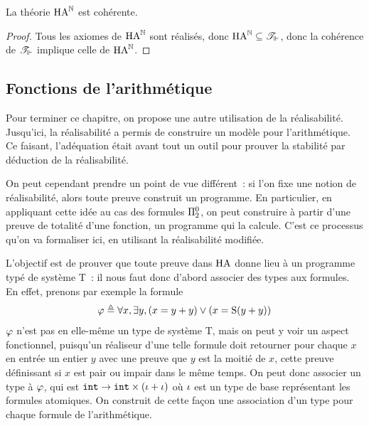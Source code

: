 \begin{theorem}
  La théorie $\operatorname{HA}^\mathbb N$ est cohérente.
\end{theorem}

\begin{proof}
  Tous les axiomes de $\operatorname{HA}^\mathbb N$ sont réalisés, donc
  $\operatorname{HA}^\mathbb N\subseteq \mathscr T_\Vdash$, donc la cohérence de $\mathscr T_\Vdash$
  implique celle de $\operatorname{HA}^\mathbb N$.
\end{proof}

\subsection{Fonctions de l'arithmétique}

Pour terminer ce chapitre, on propose une autre utilisation de la
réalisabilité. Jusqu'ici, la réalisabilité a permis de construire un
modèle pour l'arithmétique. Ce faisant, l'adéquation était avant tout
un outil pour prouver la stabilité par déduction de la réalisabilité.

On peut cependant prendre un point de vue différent~: si l'on fixe une
notion de réalisabilité, alors toute preuve construit un programme.
En particulier, en appliquant cette idée au cas des formules
$\Pi^0_{2}$, on peut construire à partir d'une preuve de totalité
d'une fonction, un programme qui la calcule. C'est ce processus qu'on
va formaliser ici, en utilisant la réalisabilité modifiée.

L'objectif est de prouver que toute preuve dans $\operatorname{HA}$ donne lieu à
un programme typé de système T~: il nous faut donc d'abord associer
des types aux formules. En effet, prenons par exemple la formule
\[\varphi \triangleq \forall x, \exists y, (x = y + y) \lor (x = \operatorname{S}(y + y))\]
$\varphi$ n'est pas en elle-même un type de système T, mais on peut y voir
un aspect fonctionnel, puisqu'un réaliseur d'une telle formule doit
retourner pour chaque $x$ en entrée un entier $y$ avec une preuve que
$y$ est la moitié de $x$, cette preuve définissant si $x$ est pair ou
impair dans le même temps. On peut donc associer un type à $\varphi$, qui
est ${\normalfont\texttt{int}} \to {\normalfont\texttt{int}} \times (\iota + \iota)$ où $\iota$ est
un type de base représentant les formules atomiques. On construit de
cette façon une association d'un type pour chaque formule de
l'arithmétique.

